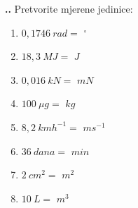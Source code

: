 
\noindent 
\textbf{
\thecjelina.\thezadatak.}
Pretvorite mjerene jedinice:
\begin{enumerate}[label=\alph*)]
  \item $0,1746\ rad=$ \hspace{2cm} $ ^\circ $
  \item $18,3\ MJ =$ \hspace{1.5cm} $ J$
  \item $0,016\ kN =$ \hspace{1.5cm} $ mN$  
  \item $100\ \mu g= $ \hspace{1.5cm} $ kg$
  \item $8,2\ kmh^{-1} =$ \hspace{1.5cm} $ms^{-1}$
  \item $36\ dana =$ \hspace{1.5cm} $min $
  \item $2\ cm^2=$ \hspace{1.5cm} $m^2 $
  \item $10\ L =$ \hspace{1.5cm} $m^3$
\end{enumerate}


